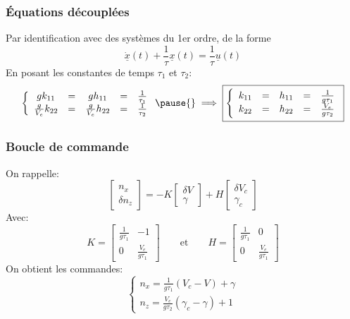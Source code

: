 \documentclass[tikz, footheight=2em]{beamer}
\begin{document}
\begin{frame}
    \frametitle{Équations découplées} \pause{}
    Par identification avec des systèmes du 1er ordre, de la forme
    \[ \underline{\dot{x}}(t) + \frac{1}{\tau}\underline{x}(t)= \frac{1}{\tau}\underline{u}(t)\]
    \pause{}
    En posant les constantes de temps \( \tau_1\) et \( \tau_2\):
    \[
    \left \{
    \begin{array}{ccccc}
        g k_{11} &=& g h_{11} &=& \frac{1}{\tau_1} \\
        \frac{g}{V_e} k_{22} &=& \frac{g}{V_e} h_{22} &=& \frac{1}{\tau_2}
    \end{array}
    \right. \pause{}
    \implies{}
    \boxed{
        \left \{
        \begin{array}{ccccc}
            k_{11} &=& h_{11} &=& \frac{1}{g \tau_1} \\
            k_{22} &=& h_{22} &=& \frac{V_e}{g \tau_2}
        \end{array}
        \right.
    }
    \]
\end{frame}

\begin{frame}
    \frametitle{Boucle de commande} \pause{}
    On rappelle:
    \[
    \left[
    \begin{array}{c}
        n_x \\
        \delta n_z
    \end{array}
    \right]
    =
    -K
    \left[
    \begin{array}{c}
        \delta V \\
        \gamma
    \end{array}
    \right]
    +H
    \left[
    \begin{array}{c}
        \delta V_c \\
        \gamma_c
    \end{array}
    \right]
    \] \pause{}
    Avec:
    \[
    K=
    \left[
    \begin{array}{cc}
        \frac{1}{g\tau_1} & -1 \\
        0 & \frac{V_e}{g\tau_1}
    \end{array}
    \right]
    \qquad
    \text{et}
    \qquad
    H=
    \left[
    \begin{array}{cc}
        \frac{1}{g\tau_1} & 0 \\
        0 & \frac{V_e}{g\tau_1}
    \end{array}
    \right]
    \] \pause{}
    On obtient les commandes:
    \[
    \boxed{
    \left \{
        \begin{array}{l}
            n_x =  \frac{1}{g\tau_1} (V_c - V) + \gamma \\
            n_z =  \frac{V_e}{g\tau_2} (\gamma_c - \gamma) + 1
        \end{array}
        \right.
    }
    \]
\end{frame}
\end{document}
